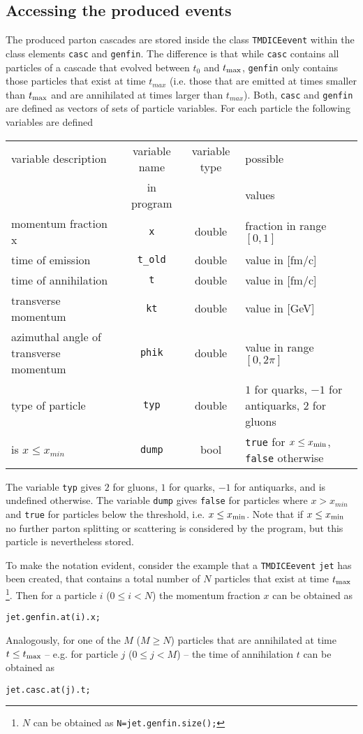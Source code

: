\documentclass[preprint,12pt]{elsarticle}
\begin{document}
\subsection{Accessing the produced events}
%
The produced parton cascades are stored inside the class \verb#TMDICEevent# within the class elements \verb#casc# and \verb#genfin#. The difference is that while \verb#casc# contains all particles of a cascade that evolved between $t_0$ and $t_{\rm max}$, \verb#genfin# only contains those particles that exist at time $t_{max}$ (i.e. those that are emitted at times smaller than $t_{\rm max}$ and are annihilated at times larger than $t_{max}$).
Both, \verb#casc# and \verb#genfin# are defined as vectors of 
sets of particle variables. 
For each particle the following variables are defined

\begin{tabular}{p{5cm}|c|c|p{5cm}}
     variable description& variable name & variable type  &possible\\
              & in program    &            &values    \\\hline
     momentum fraction x& \verb#x#& double& fraction in range $[0,1]$\\
     time of emission & \verb#t_old#&double& value in [fm/c]\\
     time of annihilation & \verb#t#&double& value in [fm/c]\\
     transverse momentum & \verb#kt#&double& value in [GeV]\\
     azimuthal angle of transverse momentum & \verb#phik# &double& value in range $[0,2\pi]$\\
     type of particle & \verb#typ#& double& $1$ for quarks, $-1$ for antiquarks, $2$ for gluons\\
     is $x\leq x_{min}$& \verb#dump#& bool& \verb#true# for $x\leq x_{\rm min}$, \verb#false# otherwise\\
\end{tabular}

The variable \verb#typ# gives $2$ for gluons, $1$ for quarks, $-1$ for antiquarks, and is undefined otherwise.
The variable \verb#dump# gives \verb#false# for particles where $x>x_{min}$ and \verb#true# for particles below the threshold, i.e. $x\leq x_{\rm min}$. Note that if $x\leq x_{\rm min}$ no further parton splitting or scattering is considered by the program, but this particle is nevertheless stored.

To make the notation evident, consider the example that a \verb#TMDICEevent# \verb#jet# has been created, that contains a total number of $N$ particles that exist at time $t_{\rm max}$\footnote{$N$ can be obtained as \verb+N=jet.genfin.size();+}. Then for a particle $i$ ($0\leq i<N$) the momentum fraction $x$ can be obtained as
\begin{verbatim}
jet.genfin.at(i).x;
\end{verbatim}
Analogously,  for one of the $M$ ($M\geq N$) particles that are annihilated at time $t\leq t_{\rm max}$ -- e.g. for particle $j$ ($0\leq j<M$) -- the time of annihilation $t$ can be obtained as 
\begin{verbatim}
jet.casc.at(j).t;
\end{verbatim}
\end{document}
